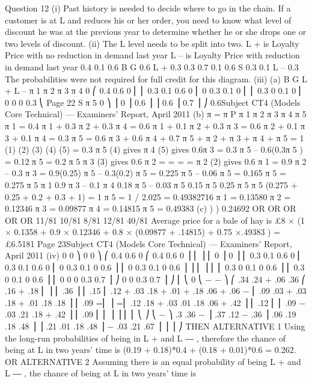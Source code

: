 \documentclass[a4paper,12pt]{article}
\begin{document}
\begin{enumerate}[1]
Question 12
(i)
Past history is needed to decide where to go in the chain.
If a customer is at L and reduces his or her order, you need to know what level of
discount he was at the previous year to determine whether he or she drops one or two
levels of discount.
(ii)
The L level needs to be split into two.
L + is Loyalty Price with no reduction in demand last year
L – is Loyalty Price with reduction in demand last year
0.4
0.1
0.6
B
G
0.6
L +
0.3
0.3
0.7
0.1
0.6
S
0.3
0.1
L –
0.3
The probabilities were not required for full credit for this diagram.
(iii)
(a)
B
G
L +
L –
π 1 π 2 π 3 π 4
0
⎛ 0.4 0.6 0
⎜
⎜ 0.3 0.1 0.6 0
⎜ 0 0.3 0.1 0
⎜
⎜ 0.3 0 0.1 0
⎜ 0
0
0 0.3
⎝
Page 22
S
π 5
0 ⎞
⎟
0 ⎟
0.6 ⎟
⎟
0.6 ⎟
0.7 ⎟ ⎠
0.6Subject CT4 (Models Core Technical) — Examiners’ Report, April 2011
(b)
π = π P
π 1
π 2
π 3
π 4
π 5
π 1
= 0.4 π 1 + 0.3 π 2 + 0.3 π 4
= 0.6 π 1 + 0.1 π 2 + 0.3 π 3
= 0.6 π 2 + 0.1 π 3 + 0.1 π 4
= 0.3 π 5
= 0.6 π 3 + 0.6 π 4 + 0.7 π 5
+ π 2 + π 3 + π 4 + π 5 = 1
(1)
(2)
(3)
(4)
(5)
= 0.3 π 5
(4) gives π 4
(5) gives 0.6π 3 = 0.3 π 5 – 0.6(0.3π 5 )
= 0.12 π 5
= 0.2 π 5
π 3
(3) gives 0.6 π 2 =
=
=
=
π 2
(2) gives 0.6 π 1 = 0.9 π 2 – 0.3 π 3
= 0.9(0.25) π 5 – 0.3(0.2) π 5
= 0.225 π 5 – 0.06 π 5
= 0.165 π 5
= 0.275 π 5
π 1
0.9 π 3 – 0.1 π 4
0.18 π 5 – 0.03 π 5
0.15 π 5
0.25 π 5
π 5 (0.275 + 0.25 + 0.2 + 0.3 + 1) = 1
π 5 = 1 / 2.025
= 0.49382716
π 1 = 0.13580
π 2 = 0.12346
π 3 = 0.09877
π 4 = 0.14815
π 5 = 0.49383
(c)
)
) 0.24692
OR
OR
OR
OR
OR
11/81
10/81
8/81
12/81
40/81
Average price for a bale of hay is
£8 × (1 × 0.1358 + 0.9 × 0.12346 + 0.8 × (0.09877 + .14815) + 0.75 ×.49383 )
= £6.5181
Page 23Subject CT4 (Models Core Technical) — Examiners’ Report, April 2011
(iv)
0
0 ⎞
0
0 ⎞ ⎛ 0.4 0.6 0
⎛ 0.4 0.6 0
⎟
⎜
⎟ ⎜
0 ⎟
0 ⎟ ⎜ 0.3 0.1 0.6 0
⎜ 0.3 0.1 0.6 0
⎜ 0 0.3 0.1 0 0.6 ⎟ ⎜ 0 0.3 0.1 0 0.6 ⎟
⎟
⎜
⎟ ⎜
⎜ 0.3 0 0.1 0 0.6 ⎟ ⎜ 0.3 0 0.1 0 0.6 ⎟
⎜ 0
0
0 0.3 0.7 ⎟ ⎠
0
0 0.3 0.7 ⎟ ⎠ ⎜ ⎝ 0
⎝
−
− ⎞ ⎛ .34
.24 + .06
.36
⎛ .16 + .18
⎜
⎟ ⎜
.36 ⎟ ⎜ .15
⎜ .12 + .03 .18 + .01 + .18 .06 + .06 −
⎜
.09 .03 + .03
.18 + .01 .18
.18 ⎟ ⎜ .09
=⎜
⎟ =⎜
.12 .18 + .03
.01
.18 .06 + .42 ⎟ ⎜ .12
⎜
⎜
.09 −
.03 .21
.18 + .42 ⎟ ⎜ .09
⎜ ⎜
⎟ ⎟ ⎜ ⎜
⎝
⎠ ⎝
− ⎞
.3 .36 −
⎟
.37 .12 − .36 ⎟
.06 .19 .18 .48 ⎟
⎟
.21 .01 .18 .48 ⎟
− .03 .21 .67 ⎟
⎟ ⎟
⎠
THEN ALTERNATIVE 1
Using the long-run probabilities of being in L + and L ― , therefore
the chance of being at L in two years’ time is
(0.19 + 0.18)*0.4 + (0.18 + 0.01)*0.6 = 0.262.
OR ALTERNATIVE 2
Assuming there is an equal probability of being L + and L ― ,
the chance of being at L in two years’ time is

\end{enumerate}
\end{document}
